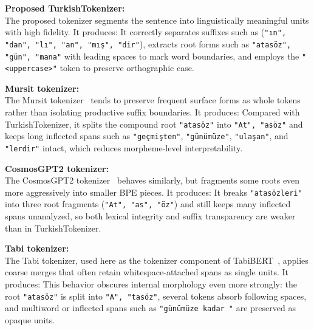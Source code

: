 \vspace{1em}

\textbf{Proposed TurkishTokenizer:} \\
The proposed tokenizer segments the sentence into linguistically meaningful units with high fidelity. It produces:
It correctly separates suffixes such as (\texttt{"ın", "dan", "lı", "an", "mış", "dir"}), extracts root forms such as \texttt{"atasöz", "gün", "mana"} with leading spaces to mark word boundaries, and employs the \texttt{"<uppercase>"} token to preserve orthographic case.

\vspace{1em}

\textbf{Mursit tokenizer:} \\
The Mursit tokenizer~\cite{mecellem2026} tends to preserve frequent surface forms as whole tokens rather than isolating productive suffix boundaries. It produces:
Compared with TurkishTokenizer, it splits the compound root \texttt{"atasöz"} into \texttt{"At", "asöz"} and keeps long inflected spans such as \texttt{"geçmişten"}, \texttt{"günümüze"}, \texttt{"ulaşan"}, and \texttt{"lerdir"} intact, which reduces morpheme-level interpretability.

\vspace{1em}

\textbf{CosmosGPT2 tokenizer:} \\
The CosmosGPT2 tokenizer~\cite{kesgin2024introducing} behaves similarly, but fragments some roots even more aggressively into smaller BPE pieces. It produces:
It breaks \texttt{"atasözleri"} into three root fragments (\texttt{"At", "as", "öz"}) and still keeps many inflected spans unanalyzed, so both lexical integrity and suffix transparency are weaker than in TurkishTokenizer.

\vspace{1em}

\textbf{Tabi tokenizer:} \\
The Tabi tokenizer, used here as the tokenizer component of TabiBERT~\cite{turker_tabibert_2026}, applies coarse merges that often retain whitespace-attached spans as single units. It produces:
This behavior obscures internal morphology even more strongly: the root \texttt{"atasöz"} is split into \texttt{"A", "tasöz"}, several tokens absorb following spaces, and multiword or inflected spans such as \texttt{"günümüze kadar "} are preserved as opaque units.

